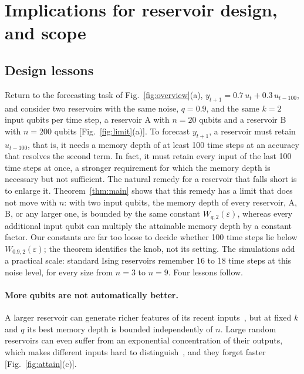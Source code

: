 \documentclass[aps,prl,twocolumn,superscriptaddress,floatfix]{revtex4-2}
\theoremstyle{plain}
\begin{document}
\section{Implications for reservoir design, and scope}
\label{sm:scope}

\subsection{Design lessons}

Return to the forecasting task of Fig.~\ref{fig:overview}(a), $y_{t+1}=0.7\,u_t+0.3\,u_{t-100}$, and consider two reservoirs with the same noise, $q=0.9$, and the same $k=2$ input qubits per time step, a reservoir A with $n=20$ qubits and a reservoir B with $n=200$ qubits [Fig.~\ref{fig:limit}(a)]. To forecast $y_{t+1}$, a reservoir must retain $u_{t-100}$, that is, it needs a memory depth of at least 100 time steps at an accuracy that resolves the second term. In fact, it must retain every input of the last 100 time steps at once, a stronger requirement for which the memory depth is necessary but not sufficient. The natural remedy for a reservoir that falls short is to enlarge it. Theorem~\ref{thm:main} shows that this remedy has a limit that does not move with $n$: with two input qubits, the memory depth of every reservoir, A, B, or any larger one, is bounded by the same constant $W_{q,2}(\varepsilon)$, whereas every additional input qubit can multiply the attainable memory depth by a constant factor. Our constants are far too loose to decide whether 100 time steps lie below $W_{0.9,2}(\varepsilon)$; the theorem identifies the knob, not its setting. The simulations add a practical scale: standard Ising reservoirs remember 16 to 18 time steps at this noise level, for every size from $n=3$ to $n=9$. Four lessons follow.

\paragraph*{More qubits are not automatically better.} A larger reservoir can generate richer features of its recent inputs~\cite{Nakajima2019}, but at fixed $k$ and $q$ its best memory depth is bounded independently of $n$. Large random reservoirs can even suffer from an exponential concentration of their outputs, which makes different inputs hard to distinguish~\cite{Xiong2025,Dao2026}, and they forget faster [Fig.~\ref{fig:attain}(c)].
\end{document}
